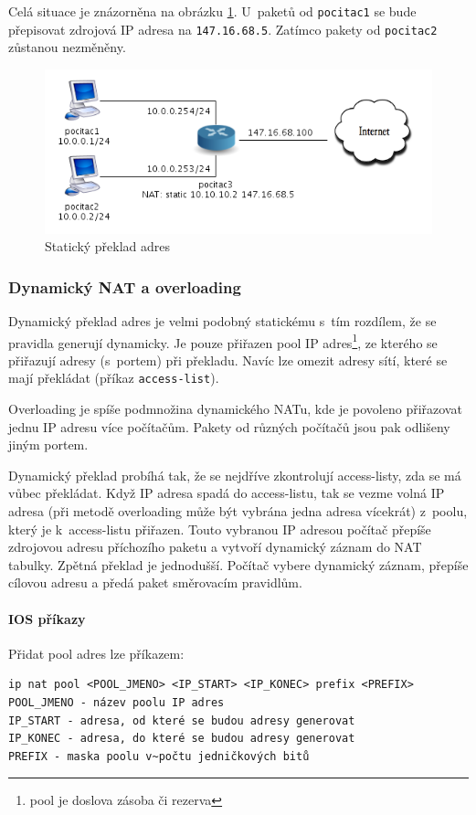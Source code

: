 Celá situace je znázorněna na obrázku \ref{fig:nat1}. U~paketů od \verb|pocitac1| se bude přepisovat zdrojová IP adresa na \verb|147.16.68.5|. Zatímco pakety od \verb|pocitac2| zůstanou nezměněny.

\begin{figure}[h]
\begin{center}
\includegraphics[width=12cm]{figures/nat1}
\caption{Statický překlad adres}
\label{fig:nat1}
\end{center}
\end{figure}

\newpage


\subsubsection{Dynamický NAT a overloading}
Dynamický překlad adres je velmi podobný statickému s~tím rozdílem, že se pravidla generují dynamicky. Je pouze přiřazen pool IP adres\footnote{pool je doslova zásoba či rezerva}, ze kterého se přiřazují adresy (s~portem) při překladu. Navíc lze omezit adresy sítí, které se mají překládat (příkaz \verb|access-list|).

Overloading je spíše podmnožina dynamického NATu, kde je povoleno přiřazovat jednu IP adresu více počítačům. Pakety od různých počítačů jsou pak odlišeny jiným portem.

Dynamický překlad probíhá tak, že se nejdříve zkontrolují access-listy, zda se má vůbec překládat. Když IP adresa spadá do access-listu, tak se vezme volná IP adresa (při metodě overloading může být vybrána jedna adresa vícekrát) z~poolu, který je k~access-listu přiřazen. Touto vybranou IP adresou počítač přepíše zdrojovou adresu příchozího paketu a vytvoří dynamický záznam do NAT tabulky. Zpětná překlad je jednodušší. Počítač vybere dynamický záznam, přepíše cílovou adresu a předá paket směrovacím pravidlům.

\paragraph{IOS příkazy}
Přidat pool adres lze příkazem:
\begin{verbatim}
ip nat pool <POOL_JMENO> <IP_START> <IP_KONEC> prefix <PREFIX>
POOL_JMENO - název poolu IP adres
IP_START - adresa, od které se budou adresy generovat
IP_KONEC - adresa, do které se budou adresy generovat
PREFIX - maska poolu v~počtu jedničkových bitů
\end{verbatim} 

